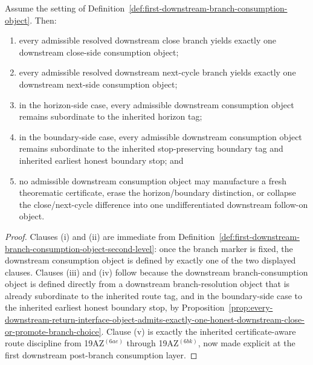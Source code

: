 \begin{proposition}
\label{prop:every-resolved-downstream-branch-yields-exactly-one-route-faithful-downstream-consumption-object}
Assume the setting of Definition~\ref{def:first-downstream-branch-consumption-object}. Then:
\begin{enumerate}[label=(\roman*)]
  \item every admissible resolved downstream close branch yields exactly one downstream close-side consumption object;
  \item every admissible resolved downstream next-cycle branch yields exactly one downstream next-side consumption object;
  \item in the horizon-side case, every admissible downstream consumption object remains subordinate to the inherited horizon tag;
  \item in the boundary-side case, every admissible downstream consumption object remains subordinate to the inherited stop-preserving boundary tag and inherited earliest honest boundary stop; and
  \item no admissible downstream consumption object may manufacture a fresh theorematic certificate, erase the horizon/boundary distinction, or collapse the close/next-cycle difference into one undifferentiated downstream follow-on object.
\end{enumerate}
\end{proposition}

\begin{proof}
Clauses (i) and (ii) are immediate from Definition~\ref{def:first-downstream-branch-consumption-object-second-level}: once the branch marker is fixed, the downstream consumption object is defined by exactly one of the two displayed clauses. Clauses (iii) and (iv) follow because the downstream branch-consumption object is defined directly from a downstream branch-resolution object that is already subordinate to the inherited route tag, and in the boundary-side case to the inherited earliest honest boundary stop, by Proposition~\ref{prop:every-downstream-return-interface-object-admits-exactly-one-honest-downstream-close-or-promote-branch-choice}. Clause (v) is exactly the inherited certificate-aware route discipline from 19AZ$^{(6ae)}$ through 19AZ$^{(6bk)}$, now made explicit at the first downstream post-branch consumption layer.
\end{proof}

